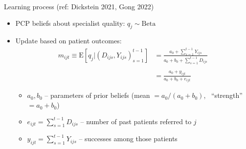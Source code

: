 \documentclass[slides, aspectratio=169]{beamer}
\newcommand{\E}{\text{E}}
\newcommand{\bit}{\begin{itemize}}
\newcommand{\eit}{\end{itemize}}
\begin{document}

\begin{frame}{Learning process}
{(ref: Dickstein 2021, Gong 2022)}
\begin{itemize}

    \item PCP beliefs about specialist quality: $q_j \sim \text{Beta}$
    \smallskip
    \pause

    \item Update based on patient outcomes:
    \begin{align*}
        m_{ijt} \equiv \E[q_j | (D_{ijs}, Y_{ijs})_{s=1}^{t-1}]
         & = \frac{ a_0 +  \sum_{s=1}^{t-1} Y_{ijs} }{ a_0 + b_0 + \sum_{s=1}^{t-1} D_{ijs} } \\
         \\
         & = \frac{ a_0 +  y_{ijt}}{ a_0 + b_0 + e_{ijt} }
    \end{align*}
    \bit    
        \item $a_0, b_0$ -- parameters of prior beliefs 
        (mean $= a_0 / (a_0 + b_0)$, \ ``strength'' $= a_0 + b_0$)
        \item $e_{ijt} = \sum_{s=1}^{t-1} D_{ijs}$ -- number of past patients referred to $j$
        \item $y_{ijt} = \sum_{s=1}^{t-1} Y_{ijs}$ -- successes among those patients
    \eit

\end{itemize}
\end{frame}
\end{document}

